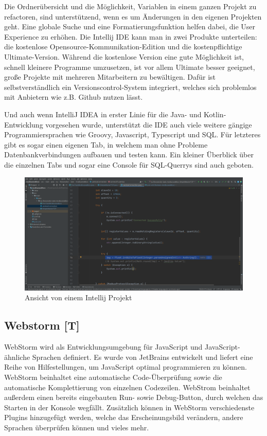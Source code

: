   Die Ordnerübersicht und die Möglichkeit, Variablen in einem ganzen Projekt zu refactoren, sind unterstützend, wenn es um Änderungen in den eigenen Projekten geht. Eine globale Suche und eine Formatierungsfunktion helfen dabei, die User Experience zu erhöhen. Die Intellij IDE kann man in zwei Produkte unterteilen: die kostenlose Opensource-Kommunikation-Edition und die kostenpflichtige Ultimate-Version. Während die kostenlose Version eine gute Möglichkeit ist, schnell kleinere Programme umzusetzen, ist vor allem Ultimate besser geeignet, große Projekte mit mehreren Mitarbeitern zu bewältigen. Dafür ist selbstverständlich ein Versionscontrol-System integriert, welches sich problemlos mit Anbietern wie z.B. Github nutzen lässt.  

Und auch wenn IntelliJ IDEA in erster Linie für die Java- und Kotlin-Entwicklung vorgesehen wurde, unterstützt die IDE auch viele weitere gängige Programmiersprachen wie Groovy, Javascript, Typescript und SQL. Für letzteres gibt es sogar einen eigenen Tab, in welchem man ohne Probleme Datenbankverbindungen aufbauen und testen kann. Ein kleiner Überblick über die einzelnen Tabs und sogar eine Console für SQL-Querrys sind auch geboten.   

\begin{figure}[h t]
  \centering
  \includegraphics[scale=0.2]{pics/IntellijOverfiew.png}
  \caption{Ansicht von einem Intellij Projekt}
  \label{fig:impl:WallboxIntellij}
\end{figure}

 
\subsection{Webstorm [T]} 
WebStorm wird als Entwicklungsumgebung für JavaScript und JavaScript-ähnliche Sprachen definiert. Es wurde von JetBrains entwickelt und liefert eine Reihe von Hilfestellungen, um JavaScript optimal programmieren zu können. WebStorm beinhaltet eine automatische Code-Überprüfung sowie die automatische Komplettierung von einzelnen Codezeilen. WebStrom beinhaltet außerdem einen bereits eingebauten Run- sowie Debug-Button, durch welchen das Starten in der Konsole wegfällt. Zusätzlich können in WebStorm verschiedenste Plugins hinzugefügt werden, welche das Erscheinungsbild verändern, andere Sprachen überprüfen können und vieles mehr. \cite{webstormOfficialSite}
